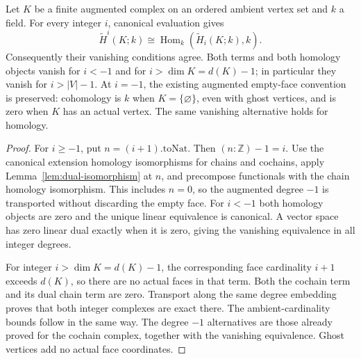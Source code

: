 \begin{lemma}\label{lem:dual}
Let $K$ be a finite augmented complex on an ordered ambient vertex set and
$k$ a field. For every integer $i$, canonical evaluation gives
\[
\widetilde H^i(K;k)\cong\operatorname{Hom}_k(\widetilde H_i(K;k),k).
\]
Consequently their vanishing conditions agree. Both terms and both homology
objects vanish for $i<-1$ and for $i>\dim K=d(K)-1$; in particular they
vanish for $i>|V|-1$. At $i=-1$, the existing augmented empty-face convention
is preserved: cohomology is $k$ when $K=\{\varnothing\}$, even with ghost
vertices, and is zero when $K$ has an actual vertex. The same vanishing
alternative holds for homology.
\leanok
\end{lemma}
\begin{proof}
For $i\geq-1$, put $n=(i+1).\mathrm{toNat}$. Then $(n:\mathbb Z)-1=i$.
Use the canonical extension homology isomorphisms for chains and cochains,
apply Lemma~\ref{lem:dual-isomorphism} at $n$, and precompose functionals
with the chain homology isomorphism. This includes $n=0$, so the augmented
degree $-1$ is transported without discarding the empty face. For $i<-1$
both homology objects are zero and the unique linear equivalence is canonical.
A vector space has zero linear dual exactly when it is zero, giving the
vanishing equivalence in all integer degrees.

For integer $i>\dim K=d(K)-1$, the corresponding face cardinality
$i+1$ exceeds $d(K)$, so there are no actual faces in that term.
Both the cochain term and its dual chain term are zero. Transport along
the same degree embedding proves that both integer complexes are exact
there. The ambient-cardinality bounds follow in the same way. The degree
$-1$ alternatives are those already proved for the cochain complex, together
with the vanishing equivalence. Ghost vertices add no actual face coordinates.
\end{proof}


